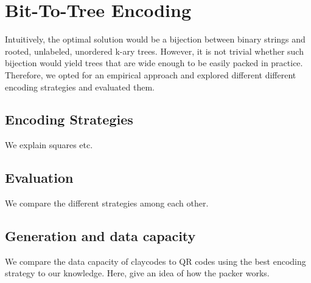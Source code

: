 \section{Bit-To-Tree Encoding}

Intuitively, the optimal solution would be a bijection between binary strings and rooted, unlabeled, unordered k-ary trees. However, it is not trivial whether such bijection would yield trees that are wide enough to be easily packed in practice. Therefore, we opted for an empirical approach and explored different different encoding strategies and evaluated them.

\subsection[strategies]{Encoding Strategies}

We explain squares etc.

\subsection[encodingEval]{Evaluation}

We compare the different strategies among each other.

\subsection[generation]{Generation and data capacity}

We compare the data capacity of claycodes to QR codes using the best encoding strategy to our knowledge. Here, give an idea of how the packer works.